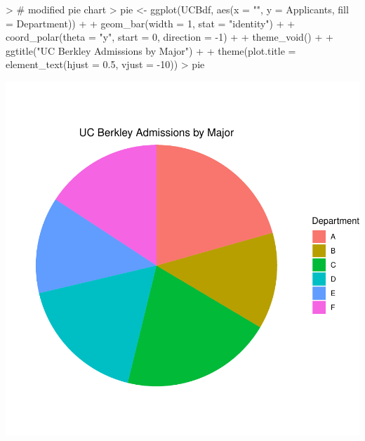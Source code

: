 \documentclass[12pt,letterpaper,final]{article}
\begin{document}
\begin{Schunk}
\begin{Sinput}
> # modified pie chart
> pie <- ggplot(UCBdf, aes(x = "", y = Applicants, fill = Department)) + 
+   geom_bar(width = 1, stat = "identity") + 
+   coord_polar(theta = "y", start = 0, direction = -1) +
+   theme_void() +
+   ggtitle("UC Berkley Admissions by Major") +
+   theme(plot.title = element_text(hjust = 0.5, vjust = -10))
> pie
\end{Sinput}
\end{Schunk}
\includegraphics{lect_main-010}
\end{document}
